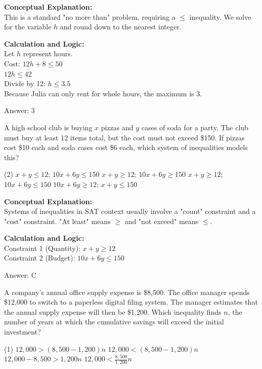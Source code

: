 \documentclass[11pt,paper=a4,answers]{exam}
\begin{document}
\begin{questions}
\begin{solution}
\textbf{Conceptual Explanation:} \\
This is a standard "no more than" problem, requiring a $\le$ inequality. We solve for the variable $h$ and round down to the nearest integer.

\vspace{10pt}
\textbf{Calculation and Logic:} \\
Let $h$ represent hours. \\
Cost: $12h + 8 \le 50$ \\
$12h \le 42$ \\
Divide by 12: $h \le 3.5$ \\
Because Julia can only rent for whole hours, the maximum is 3.

\vspace{15pt}
Answer: \colorbox{yellow!100}{3}
\end{solution}

\question
A high school club is buying $x$ pizzas and $y$ cases of soda for a party. The club must buy at least 12 items total, but the cost must not exceed \$150. If pizzas cost \$10 each and soda cases cost \$6 each, which system of inequalities models this?
\begin{tasks}(2)
    \task $x + y \le 12$; $10x + 6y \le 150$
    \task $x + y \ge 12$; $10x + 6y \ge 150$
    \task $x + y \ge 12$; $10x + 6y \le 150$
    \task $10x + 6y \ge 12$; $x + y \le 150$
\end{tasks}

\begin{solution}
\textbf{Conceptual Explanation:} \\
Systems of inequalities in SAT context usually involve a "count" constraint and a "cost" constraint. "At least" means $\ge$ and "not exceed" means $\le$.

\vspace{10pt}
\textbf{Calculation and Logic:} \\
Constraint 1 (Quantity): $x + y \ge 12$ \\
Constraint 2 (Budget): $10x + 6y \le 150$

\vspace{15pt}
Answer: \colorbox{yellow!100}{C}
\end{solution}

\question
A company's annual office supply expense is \$8,500. The office manager spends \$12,000 to switch to a paperless digital filing system. The manager estimates that the annual supply expense will then be \$1,200. Which inequality finds $n$, the number of years at which the cumulative savings will exceed the initial investment?
\begin{tasks}(1)
    \task $12,000 > (8,500 - 1,200)n$
    \task $12,000 < (8,500 - 1,200)n$
    \task $12,000 - 8,500 > 1,200n$
    \task $12,000 < \frac{8,500}{1,200}n$
\end{tasks}


\end{questions}
\end{document}
